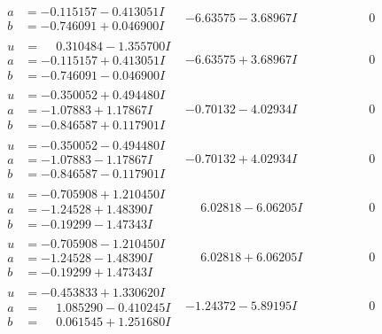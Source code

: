 \documentclass[1p]{elsarticle_modified}
\theoremstyle{definition}
\begin{document}
$$\begin{array}{c|c|c}
\begin{aligned}
a &= -0.115157 - 0.413051 I \\
b &= -0.746091 + 0.046900 I\end{aligned}
 & -6.63575 - 3.68967 I & \phantom{-0.000000 } 0 \\ \hline\begin{aligned}
u &= \phantom{-}0.310484 - 1.355700 I \\
a &= -0.115157 + 0.413051 I \\
b &= -0.746091 - 0.046900 I\end{aligned}
 & -6.63575 + 3.68967 I & \phantom{-0.000000 } 0 \\ \hline\begin{aligned}
u &= -0.350052 + 0.494480 I \\
a &= -1.07883 + 1.17867 I \\
b &= -0.846587 + 0.117901 I\end{aligned}
 & -0.70132 - 4.02934 I & \phantom{-0.000000 } 0 \\ \hline\begin{aligned}
u &= -0.350052 - 0.494480 I \\
a &= -1.07883 - 1.17867 I \\
b &= -0.846587 - 0.117901 I\end{aligned}
 & -0.70132 + 4.02934 I & \phantom{-0.000000 } 0 \\ \hline\begin{aligned}
u &= -0.705908 + 1.210450 I \\
a &= -1.24528 + 1.48390 I \\
b &= -0.19299 - 1.47343 I\end{aligned}
 & \phantom{-}6.02818 - 6.06205 I & \phantom{-0.000000 } 0 \\ \hline\begin{aligned}
u &= -0.705908 - 1.210450 I \\
a &= -1.24528 - 1.48390 I \\
b &= -0.19299 + 1.47343 I\end{aligned}
 & \phantom{-}6.02818 + 6.06205 I & \phantom{-0.000000 } 0 \\ \hline\begin{aligned}
u &= -0.453833 + 1.330620 I \\
a &= \phantom{-}1.085290 - 0.410245 I \\
b &= \phantom{-}0.061545 + 1.251680 I\end{aligned}
 & -1.24372 - 5.89195 I & \phantom{-0.000000 } 0 \\ \hline\begin{aligned}

\end{aligned}
\end{array}$$
\end{document}
